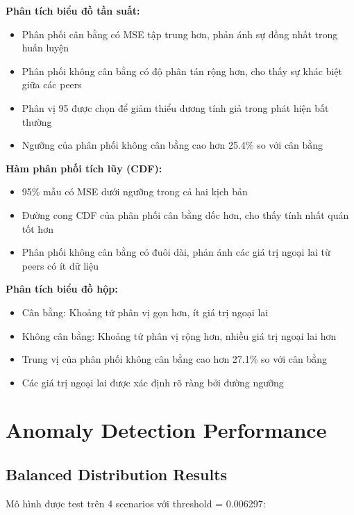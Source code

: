 \textbf{Phân tích biểu đồ tần suất:}
\begin{itemize}
    \item Phân phối cân bằng có MSE tập trung hơn, phản ánh sự đồng nhất trong huấn luyện
    \item Phân phối không cân bằng có độ phân tán rộng hơn, cho thấy sự khác biệt giữa các peers
    \item Phân vị 95 được chọn để giảm thiểu dương tính giả trong phát hiện bất thường
    \item Ngưỡng của phân phối không cân bằng cao hơn 25.4\% so với cân bằng
\end{itemize}

\textbf{Hàm phân phối tích lũy (CDF):}
\begin{itemize}
    \item 95\% mẫu có MSE dưới ngưỡng trong cả hai kịch bản
    \item Đường cong CDF của phân phối cân bằng dốc hơn, cho thấy tính nhất quán tốt hơn
    \item Phân phối không cân bằng có đuôi dài, phản ánh các giá trị ngoại lai từ peers có ít dữ liệu
\end{itemize}

\textbf{Phân tích biểu đồ hộp:}
\begin{itemize}
    \item Cân bằng: Khoảng tứ phân vị gọn hơn, ít giá trị ngoại lai
    \item Không cân bằng: Khoảng tứ phân vị rộng hơn, nhiều giá trị ngoại lai hơn
    \item Trung vị của phân phối không cân bằng cao hơn 27.1\% so với cân bằng
    \item Các giá trị ngoại lai được xác định rõ ràng bởi đường ngưỡng
\end{itemize}

\section{Anomaly Detection Performance}

\subsection{Balanced Distribution Results}

Mô hình được test trên 4 scenarios với threshold = 0.006297:

